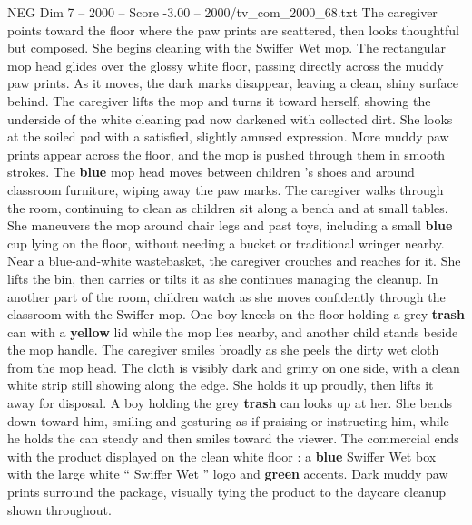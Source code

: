 \begin{textsample}{NEG Dim 7 – 2000 – Score -3.00 – 2000/tv\_com\_2000\_68.txt}
The caregiver points toward the floor where the paw prints are scattered, then looks thoughtful but composed.
She begins cleaning with the Swiffer Wet mop.
The rectangular mop head glides over the glossy white floor, passing directly across the muddy paw prints.
As it moves, the dark marks disappear, leaving a clean, shiny surface behind.
The caregiver lifts the mop and turns it toward herself, showing the underside of the white cleaning pad now darkened with collected dirt.
She looks at the soiled pad with a satisfied, slightly amused expression.
More muddy paw prints appear across the floor, and the mop is pushed through them in smooth strokes.
The \textbf{blue} mop head moves between children ’s shoes and around classroom furniture, wiping away the paw marks.
The caregiver walks through the room, continuing to clean as children sit along a bench and at small tables.
She maneuvers the mop around chair legs and past toys, including a small \textbf{blue} cup lying on the floor, without needing a bucket or traditional wringer nearby.
Near a blue-and-white wastebasket, the caregiver crouches and reaches for it.
She lifts the bin, then carries or tilts it as she continues managing the cleanup.
In another part of the room, children watch as she moves confidently through the classroom with the Swiffer mop.
One boy kneels on the floor holding a grey \textbf{trash} can with a \textbf{yellow} lid while the mop lies nearby, and another child stands beside the mop handle.
The caregiver smiles broadly as she peels the dirty wet cloth from the mop head.
The cloth is visibly dark and grimy on one side, with a clean white strip still showing along the edge.
She holds it up proudly, then lifts it away for disposal.
A boy holding the grey \textbf{trash} can looks up at her.
She bends down toward him, smiling and gesturing as if praising or instructing him, while he holds the can steady and then smiles toward the viewer.
The commercial ends with the product displayed on the clean white floor : a \textbf{blue} Swiffer Wet box with the large white “ Swiffer Wet ” logo and \textbf{green} accents.
Dark muddy paw prints surround the package, visually tying the product to the daycare cleanup shown throughout.

\end{textsample}

